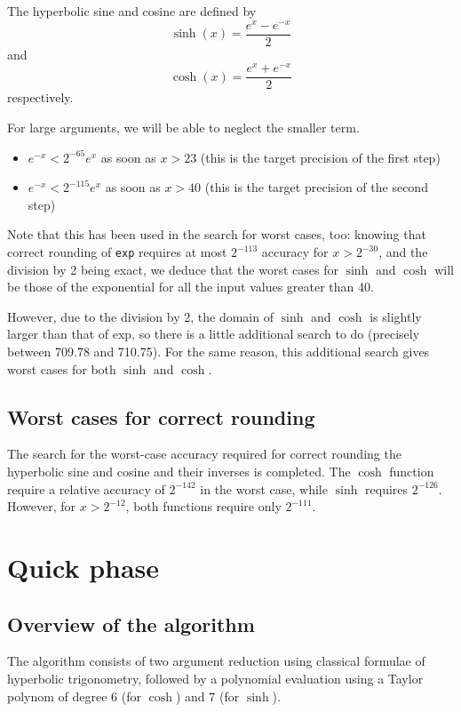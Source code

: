 The hyperbolic sine and cosine are defined by 
 $$\sinh(x) = \frac{e^x -  e^{-x}}{2}$$ 
and
 $$\cosh(x) = \frac{e^x +  e^{-x}}{2}$$
respectively.

For large arguments, we will be able to neglect the smaller term.
\begin{itemize}
\item $e^{-x}<2^{-65}e^x$ as soon as $x>23$ (this is the target precision of the first step) 
\item $e^{-x}<2^{-115}e^x$ as soon as $x>40$ (this is the target precision of the second step)
\end{itemize}

Note that this has been used in the search for worst cases, too:
knowing that correct rounding of \texttt{exp} requires at most
$2^{-113}$ accuracy for $x>2^{-30}$, and the division by 2 being
exact, we deduce that the worst cases for $\sinh$ and $\cosh$ will be
those of the exponential for all the input values greater
than 40.


However, due to the division by 2, the domain of $\sinh$ and $\cosh$
is slightly larger than that of exp, so there is a little additional
search to do (precisely between 709.78 and 710.75). For the same
reason, this additional search gives worst cases for both $\sinh$ and
$\cosh$.


\subsection{Worst cases for correct rounding}
The search for the worst-case accuracy required for correct rounding
the hyperbolic sine and cosine and their inverses is completed. The
$\cosh$ function require a relative accuracy of
$2^{-142}$ in the worst case, while $\sinh$ requires
$2^{-126}$. However, for $x>2^{-12}$, both functions require only
$2^{-111}$.


\section{Quick phase}

\subsection{Overview of the algorithm}

The algorithm consists of two argument reduction using classical
formulae of hyperbolic trigonometry, followed by a polynomial
evaluation using a Taylor polynom of degree $6$ (for $\cosh$) and $7$
(for $\sinh$).

